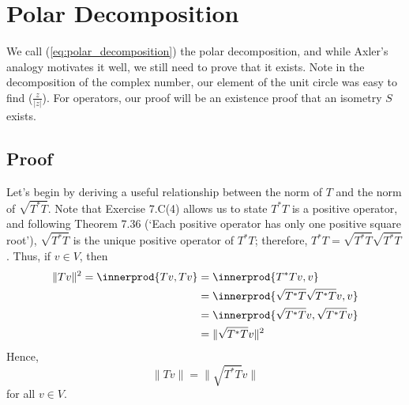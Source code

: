 \documentclass{article}
\providecommand{\abs}[1]{\lvert#1\rvert} \providecommand{\norm}[1]{\lVert#1\rVert}
\DeclarePairedDelimiter{\innerprod}\langle\rangle
\begin{document}
\section{Polar Decomposition}
We call (\ref{eq:polar_decomposition}) the polar decomposition, and while Axler's analogy motivates it well, we still need to prove that it exists. Note in the decomposition of the complex number, our element of the unit circle was easy to find ($\frac{z}{\abs{z}}$). For operators, our proof will be an existence proof that an isometry $S$ exists.

\subsection{Proof}
Let's begin by deriving a useful relationship between the norm of $T$ and the norm of $\sqrt{T^*T}$. Note that Exercise 7.C(4) allows us to state $T^*T$ is a positive operator, and following Theorem 7.36 (`Each positive operator has only one positive square root'), $\sqrt{T^*T}$ is the unique positive operator of $T^*T$; therefore, $T^*T=\sqrt{T^*T}\sqrt{T^*T}$. Thus, if $v\in V$, then
\begin{align*}
    \norm{Tv}^2=\innerprod{Tv,Tv}&=\innerprod{T^*Tv,v} \\
    &= \innerprod{\sqrt{T^*T}\sqrt{T^*T}v,v} \\
    &= \innerprod{\sqrt{T^*T}v,\sqrt{T^*T}v} \\
    &= \norm{\sqrt{T^*T}v}^2
\end{align*}
Hence,
\begin{equation}\label{eq:norm_relationship}
    \norm{Tv}=\norm{\sqrt{T^*T}v}
\end{equation}
for all $v\in V$.
\end{document}
